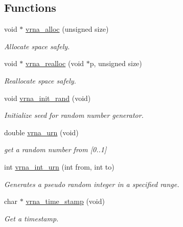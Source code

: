 \subsection*{Functions}
\begin{DoxyCompactItemize}
\item 
void $\ast$ \hyperlink{group__utils_gaf37a0979367c977edfb9da6614eebe99}{vrna\+\_\+alloc} (unsigned size)
\begin{DoxyCompactList}\small\item\em Allocate space safely. \end{DoxyCompactList}\item 
void $\ast$ \hyperlink{group__utils_ga27f4719a66c6f90d1cca3d1e6e696c6a}{vrna\+\_\+realloc} (void $\ast$p, unsigned size)
\begin{DoxyCompactList}\small\item\em Reallocate space safely. \end{DoxyCompactList}\item 
\mbox{\label{group__utils_ga0ad1f40ea316e5c5918695c35613027a}} 
void \hyperlink{group__utils_ga0ad1f40ea316e5c5918695c35613027a}{vrna\+\_\+init\+\_\+rand} (void)
\begin{DoxyCompactList}\small\item\em Initialize seed for random number generator. \end{DoxyCompactList}\item 
double \hyperlink{group__utils_ga384e256ebb295d04a14426179db0dd6e}{vrna\+\_\+urn} (void)
\begin{DoxyCompactList}\small\item\em get a random number from \mbox{[}0..1\mbox{]} \end{DoxyCompactList}\item 
int \hyperlink{group__utils_ga46111bb3747dbcf4609f0d40ae169ad9}{vrna\+\_\+int\+\_\+urn} (int from, int to)
\begin{DoxyCompactList}\small\item\em Generates a pseudo random integer in a specified range. \end{DoxyCompactList}\item 
char $\ast$ \hyperlink{group__utils_gad3bbe8d01afb1310609cb018d5290550}{vrna\+\_\+time\+\_\+stamp} (void)
\begin{DoxyCompactList}\small\item\em Get a timestamp. \end{DoxyCompactList}\item 

\end{DoxyCompactItemize}
